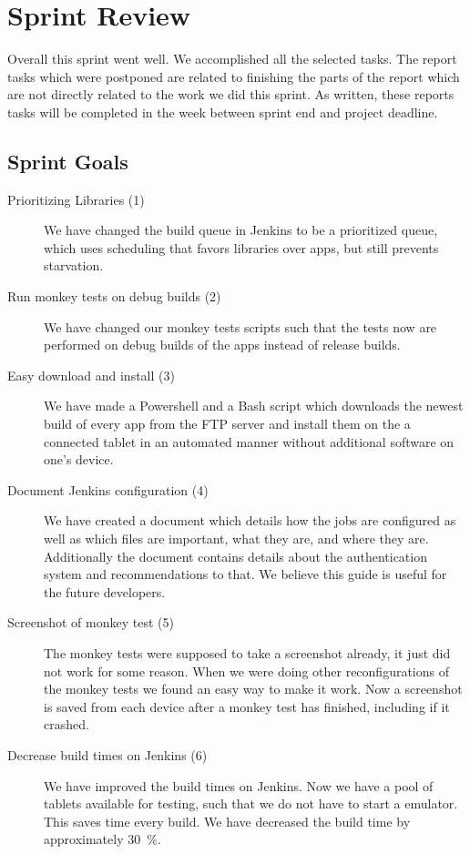 \chapter{Sprint Review}\label{chap:sprint4_end}
Overall this sprint went well. We accomplished all the selected tasks. The report tasks which were postponed are related to finishing the parts of the report which are not directly related to the work we did this sprint. As written, these reports tasks will be completed in the week between sprint end and project deadline.

\section{Sprint Goals}\label{sec:s4_goals}
\begin{description}
    \item[Prioritizing Libraries (1)] We have changed the build queue in Jenkins to be a prioritized queue, which uses scheduling that favors libraries over apps, but still prevents starvation.
    \item[Run monkey tests on debug builds (2)] We have changed our monkey tests scripts such that the tests now are performed on debug builds of the apps instead of release builds.
    \item[Easy download and install (3)] We have made a Powershell and a Bash script which downloads the newest build of every app from the FTP server and install them on the a connected tablet in an automated manner without additional software on one's device.
    \item[Document Jenkins configuration (4)] We have created a document which details how the jobs are configured as well as which files are important, what they are, and where they are. Additionally the document contains details about the authentication system and recommendations to that. We believe this guide is useful for the future developers.
    \item[Screenshot of monkey test (5)] The monkey tests were supposed to take a screenshot already, it just did not work for some reason. When we were doing other reconfigurations of the monkey tests we found an easy way to make it work. Now a screenshot is saved from each device after a monkey test has finished, including if it crashed.
    \item[Decrease build times on Jenkins (6)] We have improved the build times on Jenkins. Now we have a pool of tablets available for testing, such that we do not have to start a emulator. This saves time every build. We have decreased the build time by approximately \SI{30}{\percent}.
\end{description}
